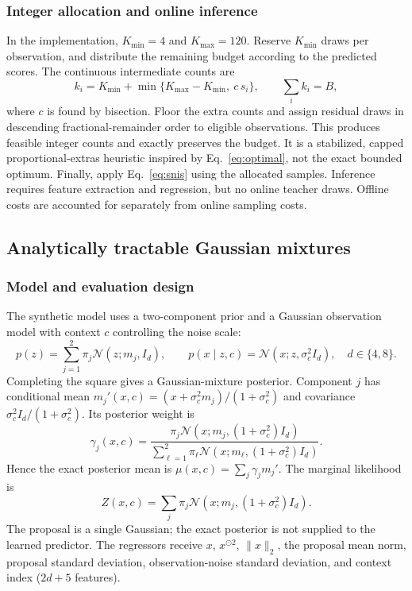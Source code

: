\documentclass[10pt,letterpaper]{article}
\newcommand{\N}{\mathcal N}
\newcommand{\norm}[1]{\lVert #1\rVert_2}
\begin{document}
\subsubsection{Integer allocation and online inference}
In the implementation, $K_{\min}=4$ and $K_{\max}=120$. Reserve $K_{\min}$ draws per observation, and distribute the remaining budget according to the predicted scores. The continuous intermediate counts are
\begin{equation}
 k_i=K_{\min}+\min\{K_{\max}-K_{\min},\ c\,s_i\},\qquad\sum_i k_i=B,
\end{equation}
where $c$ is found by bisection. Floor the extra counts and assign residual draws in descending fractional-remainder order to eligible observations. This produces feasible integer counts and exactly preserves the budget. It is a stabilized, capped proportional-extras heuristic inspired by Eq.~\eqref{eq:optimal}, not the exact bounded optimum. Finally, apply Eq.~\eqref{eq:snis} using the allocated samples. Inference requires feature extraction and regression, but no online teacher draws. Offline costs are accounted for separately from online sampling costs.


\subsection{Analytically tractable Gaussian mixtures}
\subsubsection{Model and evaluation design}
The synthetic model uses a two-component prior and a Gaussian observation model with context $c$ controlling the noise scale:
\begin{equation}
 p(z)=\sum_{j=1}^2\pi_j\N(z;m_j,I_d),\qquad p(x\mid z,c)=\N(x;z,\sigma_c^2 I_d),\quad d\in\{4,8\}.
\end{equation}
Completing the square gives a Gaussian-mixture posterior. Component $j$ has conditional mean $m_j'(x,c)=(x+\sigma_c^2m_j)/(1+\sigma_c^2)$ and covariance $\sigma_c^2 I_d/(1+\sigma_c^2)$. Its posterior weight is
\begin{equation}
 \gamma_j(x,c)=\frac{\pi_j\N(x;m_j,(1+\sigma_c^2)I_d)}{\sum_{\ell=1}^2\pi_\ell\N(x;m_\ell,(1+\sigma_c^2)I_d)}.
\end{equation}
Hence the exact posterior mean is $\mu(x,c)=\sum_j\gamma_j m_j'$. The marginal likelihood is
\[Z(x,c)=\sum_j\pi_j\N(x;m_j,(1+\sigma_c^2)I_d).\] The proposal is a single Gaussian; the exact posterior is not supplied to the learned predictor. The regressors receive $x$, $x^{\odot 2}$, $\norm{x}$, the proposal mean norm, proposal standard deviation, observation-noise standard deviation, and context index ($2d+5$ features).
\end{document}
